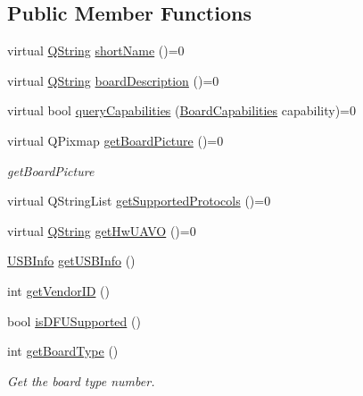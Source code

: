 \subsection*{\-Public \-Member \-Functions}
\begin{DoxyCompactItemize}
\item 
virtual \hyperlink{group___u_a_v_objects_plugin_gab9d252f49c333c94a72f97ce3105a32d}{\-Q\-String} \hyperlink{group___core_plugin_gab7a5ac1921113d9ab3a8181acb704c08}{short\-Name} ()=0
\item 
virtual \hyperlink{group___u_a_v_objects_plugin_gab9d252f49c333c94a72f97ce3105a32d}{\-Q\-String} \hyperlink{group___core_plugin_gad4ab160d20fd133acd9df87eaa398e8f}{board\-Description} ()=0
\item 
virtual bool \hyperlink{group___core_plugin_gac4aef79d19d7ee487afee6655808e722}{query\-Capabilities} (\hyperlink{group___core_plugin_ga01b09218f2a13aaeee6db007ac6bd967}{\-Board\-Capabilities} capability)=0
\item 
virtual \-Q\-Pixmap \hyperlink{group___core_plugin_gaf2965319c1d15dcb3563dd224add7858}{get\-Board\-Picture} ()=0
\begin{DoxyCompactList}\small\item\em get\-Board\-Picture \end{DoxyCompactList}\item 
virtual \-Q\-String\-List \hyperlink{group___core_plugin_ga01b18f940069cc5cdc9bfc42fef2854a}{get\-Supported\-Protocols} ()=0
\item 
virtual \hyperlink{group___u_a_v_objects_plugin_gab9d252f49c333c94a72f97ce3105a32d}{\-Q\-String} \hyperlink{group___core_plugin_ga265636c3ae87d360bcddaa13cf4d2ce4}{get\-Hw\-U\-A\-V\-O} ()=0
\item 
\hyperlink{struct_core_1_1_i_board_type_1_1_u_s_b_info}{\-U\-S\-B\-Info} \hyperlink{group___core_plugin_ga5a5ae8e61aae6fb70f4557df2c6e49dc}{get\-U\-S\-B\-Info} ()
\item 
int \hyperlink{group___core_plugin_ga6d8beb4c61fcb291ecef7dbdb8785d9f}{get\-Vendor\-I\-D} ()
\item 
bool \hyperlink{group___core_plugin_ga5a4a5e1306420d52d03a2a45ba9af280}{is\-D\-F\-U\-Supported} ()
\item 
int \hyperlink{group___core_plugin_ga5d2ecfabe310535314afc68f856c06bf}{get\-Board\-Type} ()
\begin{DoxyCompactList}\small\item\em \-Get the board type number. \end{DoxyCompactList}\end{DoxyCompactItemize}
